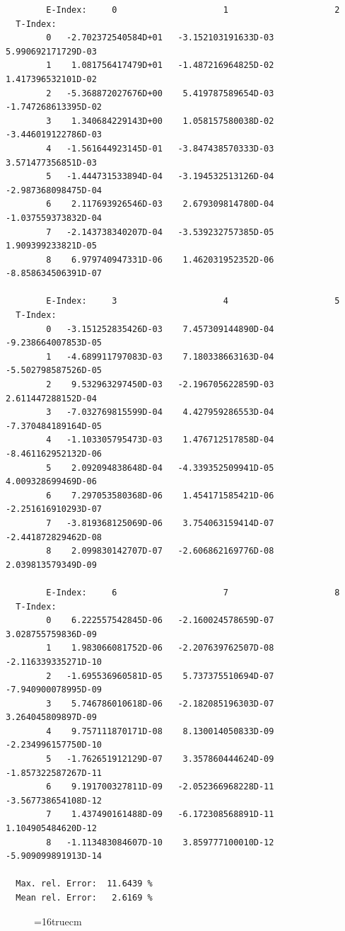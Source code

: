 \documentclass[12pt,dvips]{article}
\begin{document}
\begin{small}\begin{verbatim}
        E-Index:     0                     1                     2
  T-Index:
        0   -2.702372540584D+01   -3.152103191633D-03    5.990692171729D-03
        1    1.081756417479D+01   -1.487216964825D-02    1.417396532101D-02
        2   -5.368872027676D+00    5.419787589654D-03   -1.747268613395D-02
        3    1.340684229143D+00    1.058157580038D-02   -3.446019122786D-03
        4   -1.561644923145D-01   -3.847438570333D-03    3.571477356851D-03
        5   -1.444731533894D-04   -3.194532513126D-04   -2.987368098475D-04
        6    2.117693926546D-03    2.679309814780D-04   -1.037559373832D-04
        7   -2.143738340207D-04   -3.539232757385D-05    1.909399233821D-05
        8    6.979740947331D-06    1.462031952352D-06   -8.858634506391D-07

        E-Index:     3                     4                     5
  T-Index:
        0   -3.151252835426D-03    7.457309144890D-04   -9.238664007853D-05
        1   -4.689911797083D-03    7.180338663163D-04   -5.502798587526D-05
        2    9.532963297450D-03   -2.196705622859D-03    2.611447288152D-04
        3   -7.032769815599D-04    4.427959286553D-04   -7.370484189164D-05
        4   -1.103305795473D-03    1.476712517858D-04   -8.461162952132D-06
        5    2.092094838648D-04   -4.339352509941D-05    4.009328699469D-06
        6    7.297053580368D-06    1.454171585421D-06   -2.251616910293D-07
        7   -3.819368125069D-06    3.754063159414D-07   -2.441872829462D-08
        8    2.099830142707D-07   -2.606862169776D-08    2.039813579349D-09

        E-Index:     6                     7                     8
  T-Index:
        0    6.222557542845D-06   -2.160024578659D-07    3.028755759836D-09
        1    1.983066081752D-06   -2.207639762507D-08   -2.116339335271D-10
        2   -1.695536960581D-05    5.737375510694D-07   -7.940900078995D-09
        3    5.746786010618D-06   -2.182085196303D-07    3.264045809897D-09
        4    9.757111870171D-08    8.130014050833D-09   -2.234996157750D-10
        5   -1.762651912129D-07    3.357860444624D-09   -1.857322587267D-11
        6    9.191700327811D-09   -2.052366968228D-11   -3.567738654108D-12
        7    1.437490161488D-09   -6.172308568891D-11    1.104905484620D-12
        8   -1.113483084607D-10    3.859777100010D-12   -5.909099891913D-14

  Max. rel. Error:  11.6439 %
  Mean rel. Error:   2.6169 %
\end{verbatim}\end{small}
\begin{figure} \label{2.2.5g}
\epsfxsize=16truecm
\end{figure}
\newpage
\end{document}
